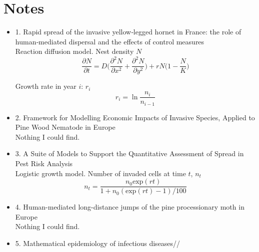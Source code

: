 \documentclass[11pt]{article}
\theoremstyle{definition}
\begin{document}
\section{Notes}
\begin{itemize}
\item 1. Rapid spread of the invasive yellow‐legged hornet in France: the role of human‐mediated dispersal and the effects of control measures \\

Reaction diffusion model. Nest density $N$
$$\dfrac{\partial N}{\partial t} = D \Big( \dfrac{\partial^2 N}{\partial x^2} + \dfrac{\partial^2 N}{\partial y^2} \Big) + rN \Big( 1 - \dfrac{N}{K} \Big)$$

 Growth rate in year $i$: $r_i$
$$r_i = \ln{\dfrac{n_i}{n_{i-1}}}$$
\item 2. Framework for Modelling Economic Impacts of Invasive Species, Applied to Pine Wood Nematode in Europe\\

Nothing I could find.
\item 3. A Suite of Models to Support the Quantitative Assessment of Spread in Pest Risk Analysis\\

Logistic growth model. Number of invaded cells at time $t$, $n_t$
$$n_t = \dfrac{n_0\text{exp}(rt)}{1+n_0(\text{exp}(rt)-1)/100}$$

\item 4. Human-mediated long-distance jumps of the pine processionary moth in Europe\\

Nothing I could find.
\item 5. Mathematical epidemiology of infectious diseases//


\end{itemize}
\end{document}
